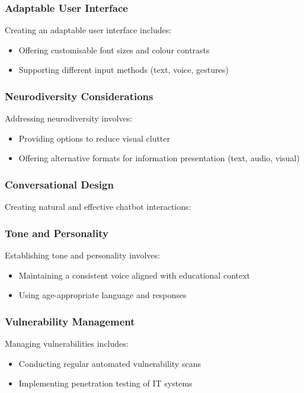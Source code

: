 \documentclass[14pt,a4paper]{article}
\begin{document}
\begin{multicols}{2}
\subsubsection{Adaptable User Interface}
Creating an adaptable user interface \textit{\parencite[pp. 20-50]{HarperYesilada2024}} includes:
\begin{itemize}
    \item Offering customisable font sizes and colour contrasts
    \item Supporting different input methods (text, voice, gestures)
\end{itemize}

\subsubsection{Neurodiversity Considerations}
Addressing neurodiversity \textit{\parencite[pp. 30-60]{Armstrong2023}} involves:
\begin{itemize}
    \item Providing options to reduce visual clutter
    \item Offering alternative formats for information presentation (text, audio, visual)
\end{itemize}

\subsubsection{Conversational Design}
Creating natural and effective chatbot interactions:


\subsubsection{Tone and Personality}
Establishing tone and personality \textit{\parencite[pp. 20-50]{Bradbury2024}} involves:
\begin{itemize}
    \item Maintaining a consistent voice aligned with educational context
    \item Using age-appropriate language and responses
\end{itemize}



\subsubsection*{Vulnerability Management}
Managing vulnerabilities \textit{\parencite[pp. 150-200]{StuttardPinto2023}} includes:
\begin{itemize}
    \item Conducting regular automated vulnerability scans
    \item Implementing penetration testing of IT systems
\end{itemize}



\end{multicols}
\end{document}
